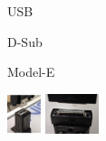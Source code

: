 \begin{figure}[t]
    \centering
    \begin{subfigure}{0.14\linewidth}
        \center
        USB \vspace{1.2cm}
        
        D-Sub \vspace{1.2cm}
        
        Model-E
    \end{subfigure}
    \begin{subfigure}{0.14\linewidth}
        \center
        \includegraphics[height=1.17cm]{insertion/newfigs/usb.png} \vspace{0.5cm}
        
        \includegraphics[height=1.17cm]{insertion/newfigs/dsub.png} \vspace{0.5cm}
        

\end{subfigure}
\end{figure}
